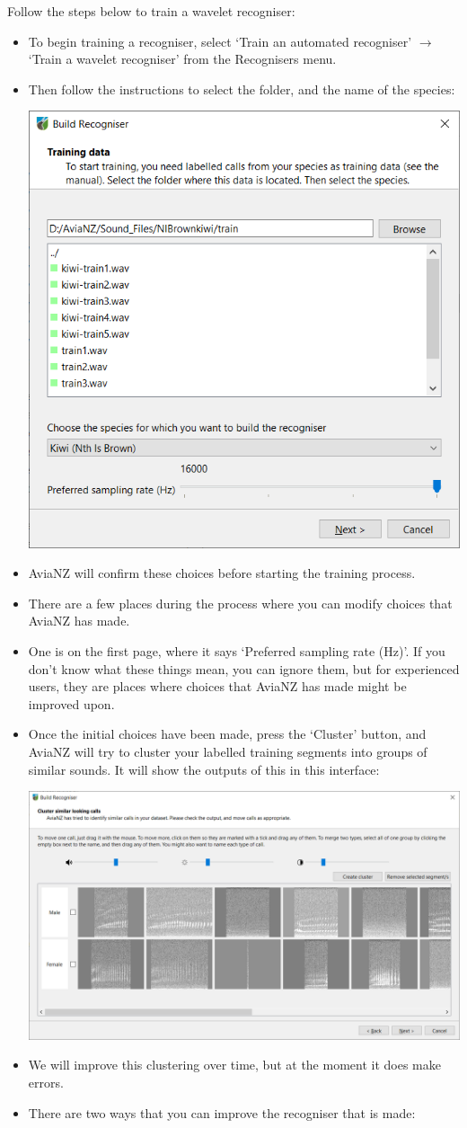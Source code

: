 \documentclass{article}
\begin{document}
Follow the steps below to train a wavelet recogniser:
\begin{itemize}

\item To begin training a recogniser, select `Train an automated recogniser' $\rightarrow$ `Train a wavelet recogniser' from the Recognisers menu. 
\item Then follow the instructions to select the folder, and the name of the species:
\begin{center}
    \includegraphics[width=.4\textwidth]{Figs/Wizard_start}
\end{center}

\item AviaNZ will confirm these choices before starting the training process. 
\item There are a few places during the process where you can modify choices that AviaNZ has made. 
\item One is on the first page, where it says `Preferred sampling rate (Hz)'. If you don't know what these things mean, you can ignore them, but for experienced users, they are places where choices that AviaNZ has made might be improved upon. 
\item Once the initial choices have been made, press the `Cluster' button, and AviaNZ will try to cluster your labelled training segments into groups of similar sounds. It will show the outputs of this in this interface:
\begin{center}
    \includegraphics[width=.6\textwidth]{Figs/Wizard_cluster}
\end{center}
\item We will improve this clustering over time, but at the moment it does make errors. 
\item There are two ways that you can improve the recogniser that is made:


\end{itemize}
\end{document}
